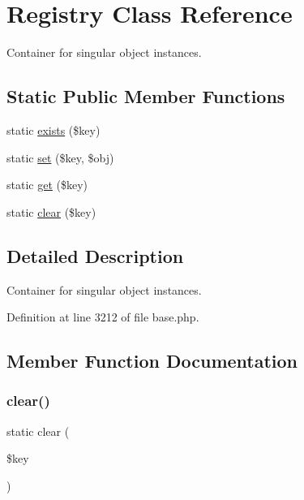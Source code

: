 \hypertarget{class_registry}{}\section{Registry Class Reference}
\label{class_registry}


Container for singular object instances.  


\subsection*{Static Public Member Functions}
\begin{DoxyCompactItemize}
\item 
static \hyperlink{class_registry_a1a924eadddd0dc6fd3f6604a2352d950}{exists} (\$key)
\item 
static \hyperlink{class_registry_a8e135dfaf92afaa049c3f0bfe3437820}{set} (\$key, \$obj)
\item 
static \hyperlink{class_registry_a15e2679f2a8f6fa4d60757f4d65413ac}{get} (\$key)
\item 
static \hyperlink{class_registry_acc8237f9189f8ad2a9d854895561dbc2}{clear} (\$key)
\end{DoxyCompactItemize}


\subsection{Detailed Description}
Container for singular object instances. 

Definition at line 3212 of file base.\+php.



\subsection{Member Function Documentation}
\hypertarget{class_registry_acc8237f9189f8ad2a9d854895561dbc2}{}\label{class_registry_acc8237f9189f8ad2a9d854895561dbc2} 
\subsubsection{\texorpdfstring{clear()}{clear()}}
{\footnotesize\ttfamily static clear (\begin{DoxyParamCaption}\item[{}]{\$key }\end{DoxyParamCaption})\hspace{0.3cm}{\ttfamily [static]}}

